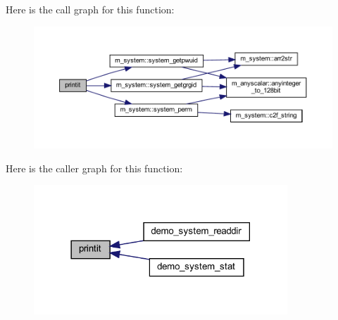 Here is the call graph for this function\+:
\nopagebreak
\begin{figure}[H]
\begin{center}
\leavevmode
\includegraphics[width=350pt]{__ls_8f90_a776aaa5526c5060cfed769a9836bd8da_cgraph}
\end{center}
\end{figure}
Here is the caller graph for this function\+:
\nopagebreak
\begin{figure}[H]
\begin{center}
\leavevmode
\includegraphics[width=270pt]{__ls_8f90_a776aaa5526c5060cfed769a9836bd8da_icgraph}
\end{center}
\end{figure}
